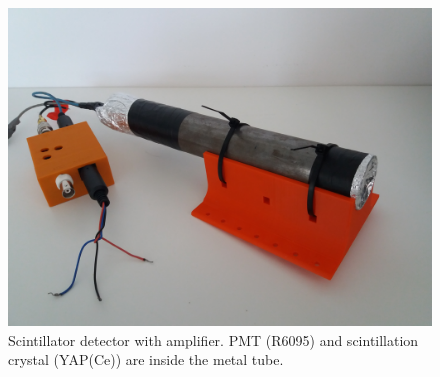 \begin{figure}[H]
 \centering
\includegraphics[scale=0.1, angle = 0]{./pictures/Scintillator.jpg}
 \caption{Scintillator detector with amplifier. PMT (R6095) and scintillation crystal (YAP(Ce)) are inside the metal tube.}
 \label{scintillator}
 
\end{figure}


